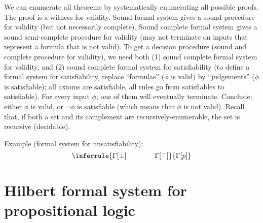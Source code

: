 {{We can enumerate all theorems by systematically enumerating all possible proofs.
The proof is a witness for validity.
Sound formal system gives a sound procedure for validity (but not necessarily complete).
Sound complete formal system gives a sound semi-complete procedure for validity (may not terminate on inputs
that represent a formula that is not valid).
To get a decision procedure (sound and complete procedure for validity), we need both
(1) sound complete formal system for validity, and
(2) sound complete formal system for satisfiability (to define a formal system for satisfiability,
replace ``formulas'' ($\phi$ is valid) by ``judgements'' ($\phi$ is satisfiable);
all axioms are satisfiable, all rules go from satisfiables to satisfiable).
For every input $\phi$, one of them will eventually terminate.
Conclude; either $\phi$ is valid, or $\neg\phi$ is satisfiable (which means that $\phi$ is not valid).
Recall that, if both a set and its complement are recursively-enumerable, the set is recursive (decidable).

Example (formal system for unsatisfiability):
$$\inferrule
{\Gamma[\bot]\qquad\qquad\Gamma[\top]}
{\Gamma[p]}
$$

\section{Hilbert formal system for propositional logic}

}}
